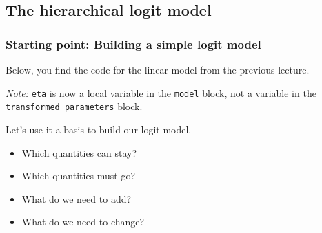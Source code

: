 \documentclass[
  11pt,
]{article}
\providecommand{\tightlist}{%
  \setlength{\itemsep}{0pt}\setlength{\parskip}{0pt}}
\begin{document}
\hypertarget{the-hierarchical-logit-model}{%
\subsection{The hierarchical logit model}\label{the-hierarchical-logit-model}}

\hypertarget{starting-point-building-a-simple-logit-model}{%
\subsubsection{Starting point: Building a simple logit model}\label{starting-point-building-a-simple-logit-model}}

Below, you find the code for the linear model from the previous lecture.

\emph{Note:} \texttt{eta} is now a local variable in the \texttt{model} block, not a variable in the \texttt{transformed\ parameters} block.

Let's use it a basis to build our logit model.

\begin{itemize}
\tightlist
\item
  Which quantities can stay?
\item
  Which quantities must go?
\item
  What do we need to add?
\item
  What do we need to change?
\end{itemize}
\end{document}

